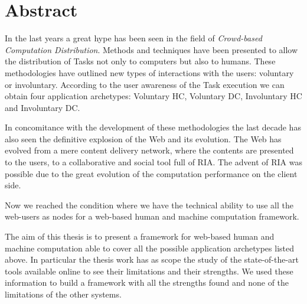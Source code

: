 \newpage
{}
\chapter*{Abstract}

In the last years a great hype has been seen in the field of \emph{Crowd-based
Computation Distribution}. Methods and techniques have been presented to allow the
distribution of Tasks not only to computers but also to humans. These
methodologies have outlined new types of interactions with the users: voluntary or involuntary. According to the user awareness of the Task execution we can obtain
four application archetypes: Voluntary \acl{HC}, Voluntary \acl{DC},
Involuntary \acl{HC} and Involuntary \acl{DC}.

In concomitance with the development of these methodologies the last decade has also
seen the definitive explosion of the Web and its evolution.
The Web has evolved from a mere content delivery network, where the contents are
presented to the users, to a collaborative and social tool full of \ac{RIA}. The
advent of \ac{RIA} was possible due to the great evolution of the computation
performance on the client side.

Now we reached the condition where we have the technical ability to use all the
web-users as nodes for a web-based human and machine computation framework.

The aim of this thesis is to present a framework for web-based human and machine
computation able to cover all the possible application archetypes listed above.
In particular the thesis work has as scope the study of the state-of-the-art
tools available online to see their limitations and their strengths. We used
these information to build a framework with all the strengths found
and none of the limitations of the other systems.


\endgroup			

\vfill

